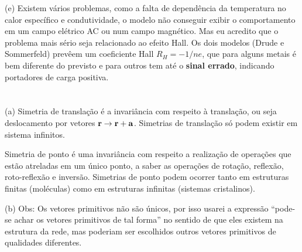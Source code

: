 \documentclass[a4paper,10pt]{article}
\begin{document}
\n

(e) Existem vários problemas, como a falta de dependência da temperatura no calor específico e condutividade, o modelo não conseguir exibir o comportamento em um campo elétrico AC ou num campo magnético. Mas eu acredito que o problema mais sério seja relacionado ao efeito Hall. Os dois modelos (Drude e Sommerfeld) prevêem um coeficiente Hall $R_H = - 1/ne$, que para alguns metais é bem diferente do previsto e para outros tem até o \textbf{sinal errado}, indicando portadores de carga positiva.

\section{}

(a) Simetria de translação é a invariância com respeito à translação, ou seja deslocamento por vetores $\vb{r} \to \vb{r} + \vb{a}$. Simetrias de translação só podem existir em sistema infinitos.

Simetria de ponto é uma invariância com respeito a realização de operações que estão atreladas em um único ponto, a saber as operações de rotação, reflexão, roto-reflexão e inversão. Simetrias de ponto podem ocorrer tanto em estruturas finitas (moléculas) como em estruturas infinitas (sistemas cristalinos).

\n

(b) Obs: Os vetores primitivos não são únicos, por isso usarei a expressão ``pode-se achar os vetores primitivos de tal forma'' no sentido de que eles existem na estrutura da rede, mas poderiam ser escolhidos outros vetores primitivos de qualidades diferentes.

\n
\end{document}
